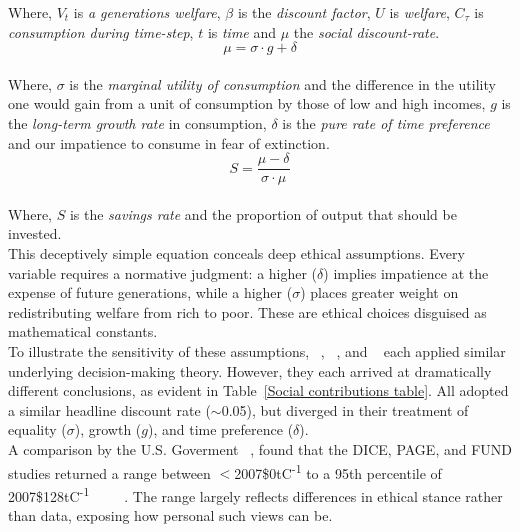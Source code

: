 Where, $V_t$ is \emph{a generations welfare}, $\beta$ is the \emph{discount factor}, $U$ is \emph{welfare}, $C_\tau$ is \emph{consumption during time-step}, $t$ is \emph{time} and $\mu$ the \emph{social discount-rate}.\\

\begin{equation}
\mu = \sigma \cdot g + \delta
\end{equation}\\

Where, $\sigma$ is the \emph{marginal utility of consumption} and the difference in the utility one would gain from a unit of consumption by those of low and high incomes, $g$ is the \emph{long-term growth rate} in consumption, $\delta$ is the \emph{pure rate of time preference} and our impatience to consume in fear of extinction.\\

\begin{equation}
S = \frac{\mu-\delta}{\sigma \cdot \mu}
\end{equation}\\

Where, $S$ is the \emph{savings rate} and the proportion of output that should be invested.\\

This deceptively simple equation conceals deep ethical assumptions.
Every variable requires a normative judgment: a higher ($\delta$) implies impatience at the expense of future generations, while a higher ($\sigma$) places greater weight on redistributing welfare from rich to poor.
These are ethical choices disguised as mathematical constants.\\

To illustrate the sensitivity of these assumptions, ~\cite{wc1}, ~\cite{wn1}, and ~\cite{ns1} each applied similar underlying decision-making theory.
However, they each arrived at dramatically different conclusions, as evident in Table~\ref{Social contributions table}.
All adopted a similar headline discount rate ($\sim$0.05), but diverged in their treatment of equality ($\sigma$), growth ($g$), and time preference ($\delta$).\\

A comparison by the U.S. Goverment ~\cite{iwg1}, found that the DICE, PAGE, and FUND studies returned a range between $<$2007\$0tC\textsuperscript{-1} to a 95th percentile of 2007\$128tC\textsuperscript{-1} ~\cite{wn1} ~\cite{ch1} ~\cite{rsjt1}.
The range largely reflects differences in ethical stance rather than data, exposing how personal such views can be.\\

